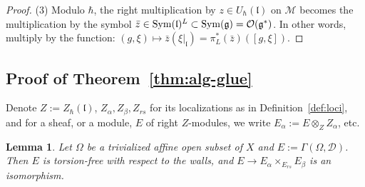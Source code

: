 \documentclass{article}
\theoremstyle{plain}
\newtheorem{lemma}[theorem]{Lemma}
\theoremstyle{definition}
\theoremstyle{remark}
\numberwithin{equation}{section}
\begin{document}
\begin{proof}
(3) Modulo $\hbar$, the right multiplication by $z\in U_\hbar(\mathfrak l)$ on $\mathcal M$ becomes the multiplication by the
symbol $\bar z\in \operatorname{Sym}(\mathfrak l)^L\subset \operatorname{Sym}(\mathfrak g)=\mathcal O(\mathfrak g^*)$. In other words, multiply by the function: 
$(g,\xi)\mapsto\bar z(\xi|_{\mathfrak l})=\pi_L^*(\bar z)([g,\xi])$.
\end{proof}


\subsection{Proof of Theorem~\ref{thm:alg-glue}}\label{sec:hartogs-proof}
Denote $Z:=Z_\hbar(\mathfrak l)$, $Z_\alpha,Z_\beta,Z_{rs}$ for its localizations as in Definition~\ref{def:loci}, and for a sheaf, or a module, $E$ of right $Z$-modules, we write $E_\alpha:=E\otimes_ZZ_\alpha$, etc.

\begin{lemma}\label{lem:local-hartogs}
Let $\Omega$ be a trivialized affine open subset of $X$ and $E:=\Gamma(\Omega,\mathcal D)$. Then $E$ is torsion-free with
respect to the walls, and $E\to E_\alpha\times_{E_{rs}}E_\beta$ is an isomorphism.
\end{lemma}
\end{document}
